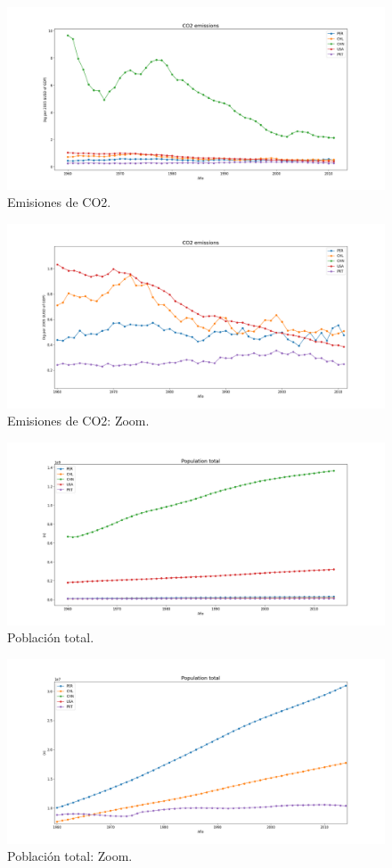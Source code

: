 \documentclass{article}
\begin{document}
\begin{figure}
	\centering
	\includegraphics[scale=0.38]{images/figure_1-8.png}
	\caption{Emisiones de CO2.}
	\label{fig:10}
\end{figure}

\begin{figure}
	\centering
	\includegraphics[scale=0.38]{images/zoom - co2.png}
	\caption{Emisiones de CO2: Zoom.}
	\label{fig:11}
\end{figure}

\begin{figure}
	\centering
	\includegraphics[scale=0.38]{images/populationtotal.png}
	\caption{Población total.}
	\label{fig:12}
\end{figure}

\begin{figure}
	\centering
	\includegraphics[scale=0.38]{images/pt-zoom.png}
	\caption{Población total: Zoom.}
	\label{fig:13}
\end{figure}
\end{document}
